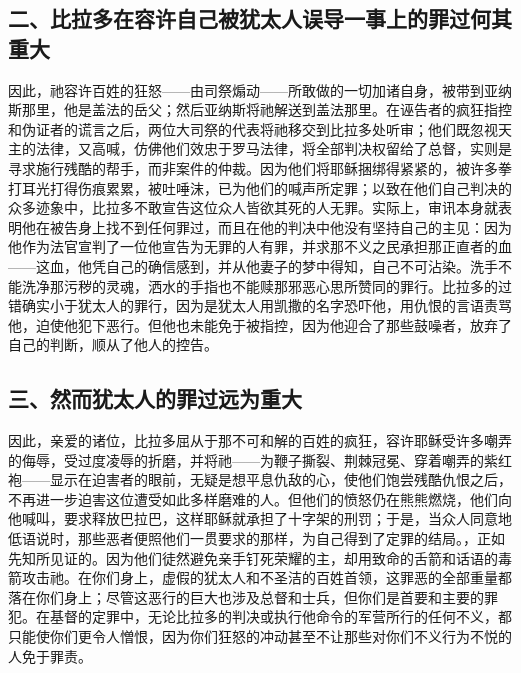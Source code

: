 
\subsection{二、比拉多在容许自己被犹太人误导一事上的罪过何其重大}

因此，祂容许百姓的狂怒——由司祭煽动——所敢做的一切加诸自身，被带到亚纳斯那里，他是盖法的岳父；然后亚纳斯将祂解送到盖法那里。在诬告者的疯狂指控和伪证者的谎言之后，两位大司祭的代表将祂移交到比拉多处听审；他们既忽视天主的法律，又高喊，仿佛他们效忠于罗马法律，将全部判决权留给了总督，实则是寻求施行残酷的帮手，而非案件的仲裁。因为他们将耶稣捆绑得紧紧的，被许多拳打耳光打得伤痕累累，被吐唾沫，已为他们的喊声所定罪；以致在他们自己判决的众多迹象中，比拉多不敢宣告这位众人皆欲其死的人无罪。实际上，审讯本身就表明他在被告身上找不到任何罪过，而且在他的判决中他没有坚持自己的主见：因为他作为法官宣判了一位他宣告为无罪的人有罪，并求那不义之民承担那正直者的血——这血，他凭自己的确信感到，并从他妻子的梦中得知，自己不可沾染。洗手不能洗净那污秽的灵魂，洒水的手指也不能赎那邪恶心思所赞同的罪行。比拉多的过错确实小于犹太人的罪行，因为是犹太人用凯撒的名字恐吓他，用仇恨的言语责骂他，迫使他犯下恶行。但他也未能免于被指控，因为他迎合了那些鼓噪者，放弃了自己的判断，顺从了他人的控告。\par


\subsection{三、然而犹太人的罪过远为重大}

因此，亲爱的诸位，比拉多屈从于那不可和解的百姓的疯狂，容许耶稣受许多嘲弄的侮辱，受过度凌辱的折磨，并将祂——为鞭子撕裂、荆棘冠冕、穿着嘲弄的紫红袍——显示在迫害者的眼前，无疑是想平息仇敌的心，使他们饱尝残酷仇恨之后，不再进一步迫害这位遭受如此多样磨难的人。但他们的愤怒仍在熊熊燃烧，他们向他喊叫，要求释放巴拉巴，这样耶稣就承担了十字架的刑罚；于是，当众人同意地低语说时，那些恶者便照他们一贯要求的那样，为自己得到了定罪的结局。，正如先知所见证的。因为他们徒然避免亲手钉死荣耀的主，却用致命的舌箭和话语的毒箭攻击祂。在你们身上，虚假的犹太人和不圣洁的百姓首领，这罪恶的全部重量都落在你们身上；尽管这恶行的巨大也涉及总督和士兵，但你们是首要和主要的罪犯。在基督的定罪中，无论比拉多的判决或执行他命令的军营所行的任何不义，都只能使你们更令人憎恨，因为你们狂怒的冲动甚至不让那些对你们不义行为不悦的人免于罪责。\par

